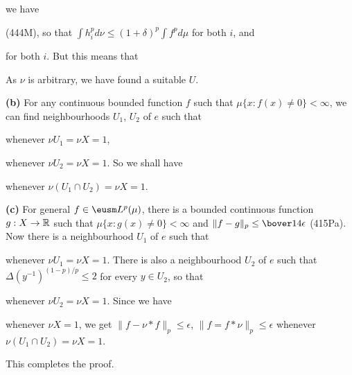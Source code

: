 {

\noindent we have


\noindent (444M), so that $\int h_i^pd\nu\le(1+\delta)^p\int f^pd\mu$
for both $i$, and


\noindent for both $i$.   But this means that


\noindent As $\nu$ is arbitrary, we have found a suitable $U$.

\medskip

{\bf (b)} For any continuous bounded function $f$ such that
$\mu\{x:f(x)\ne 0\}<\infty$, we can find neighbourhoods $U_1$, $U_2$ of
$e$ such that


\noindent whenever $\nu U_1=\nu X=1$,


\noindent whenever $\nu U_2=\nu X=1$.   So we shall have


\noindent whenever $\nu(U_1\cap U_2)=\nu X=1$.

\medskip

{\bf (c)} For general $f\in\eusm L^p(\mu)$, there is a bounded
continuous function $g:X\to\Bbb R$ such that $\mu\{x:g(x)\ne 0\}<\infty$
and $\|f-g\|_p\le\bover14\epsilon$ (415Pa).   Now there is a
neighbourhood $U_1$ of $e$ such that


\noindent whenever $\nu U_1=\nu X=1$.   There is also a neighbourhood
$U_2$ of $e$ such that $\Delta(y^{-1})^{(1-p)/p}\le 2$ for every
$y\in U_2$, so that


\noindent whenever $\nu U_2=\nu X=1$.   Since we have


\noindent whenever $\nu X=1$, we get $\|f-\nu*f\|_p\le\epsilon$,
$\|f=f*\nu\|_p\le\epsilon$ whenever $\nu(U_1\cap U_2)=\nu X=1$.

This completes the proof.
}%

